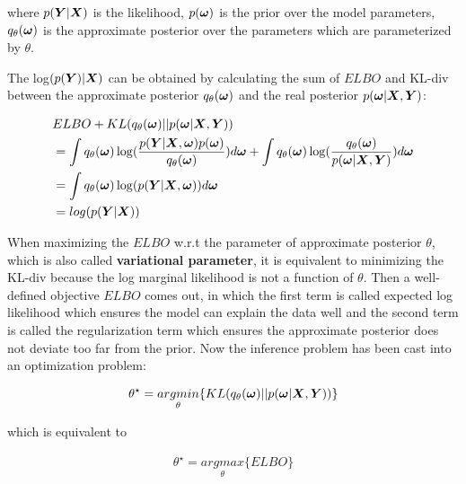 where $p(\boldsymbol Y| \boldsymbol X)$ is the likelihood, $p(\boldsymbol \omega)$ is the prior over the model parameters, $q_{\theta}(\boldsymbol \omega)$ is the approximate posterior over the parameters which are parameterized by $\theta$.

The log$(p(\boldsymbol Y) | \boldsymbol X)$ can be obtained by calculating the sum of $ELBO$ and \gls{KL-div} between the approximate posterior $q_{\theta}(\boldsymbol \omega)$ and the real posterior $p(\boldsymbol \omega | \boldsymbol X, \boldsymbol Y)$:

\begin{equation}\label{2.7}	
\begin{aligned}
& ELBO + KL(q_{\theta}(\boldsymbol{\omega}) || p(\boldsymbol{\omega}|\boldsymbol{X}, \boldsymbol{Y})) \\ 
& = \int q_{\theta}(\boldsymbol{\omega}) \log( \frac{p(\boldsymbol{Y}| \boldsymbol{X}, \boldsymbol{\omega}) p(\boldsymbol{\omega})}{q_{\theta}(\boldsymbol{\omega})}) d\boldsymbol{\omega} + \int q_{\theta}(\boldsymbol{\omega}) \log(\frac{q_{\theta}(\boldsymbol{\omega})}{p(\boldsymbol{\omega}|\boldsymbol{X}, \boldsymbol{Y})}) d\boldsymbol{\omega} \\
& = \int q_{\theta}(\boldsymbol{\omega}) \log(p(\boldsymbol{Y} | \boldsymbol{X}, \boldsymbol \omega))d\boldsymbol{\omega}\\
& = log(p(\boldsymbol{Y}|\boldsymbol{X})) 
\end{aligned}
\end{equation}

When maximizing the $ELBO$ w.r.t the parameter of approximate posterior $\theta$, which is also called \textbf{variational parameter}, it is equivalent to minimizing the \gls{KL-div} because the log marginal likelihood is not a function of $\theta$. Then a well-defined objective $ELBO$ comes out, in which the first term is called expected log likelihood which ensures the model can explain the data well and the second term is called the regularization term which ensures the approximate posterior does not deviate too far from the prior.
Now the inference problem has been cast into an optimization problem:

\begin{equation}\label{2.8}	
\begin{aligned}
\theta^{\star} = \underset{\theta}{argmin} \{KL(q_{\theta}(\boldsymbol \omega)||p(\boldsymbol \omega | \boldsymbol X, \boldsymbol Y))\}
\end{aligned}
\end{equation}

which is equivalent to 

\begin{equation}\label{2.9}	
\begin{aligned}
\theta^{\star} = \underset{\theta}{argmax}\{ELBO\}
\end{aligned}
\end{equation}

